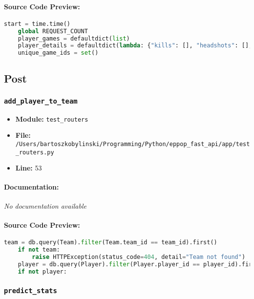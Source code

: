 \documentclass[11pt,a4paper]{article}
\begin{document}
\paragraph{Source Code Preview:}
\begin{lstlisting}[language=Python]
    start = time.time()
    global REQUEST_COUNT
    player_games = defaultdict(list)
    player_details = defaultdict(lambda: {"kills": [], "headshots": [], "rounds": []})
    unique_game_ids = set()
\end{lstlisting}

\vspace{1em}
\subsection{Post}

\subsubsection{\texttt{add\_player\_to\_team}}

\begin{itemize}
    \item \textbf{Module:} \texttt{test\_routers}
    \item \textbf{File:} \texttt{/Users/bartoszkobylinski/Programming/Python/eppop\_fast\_api/app/test\_routers.py}
    \item \textbf{Line:} 53
\end{itemize}

\paragraph{Documentation:} \textit{No documentation available}

\paragraph{Source Code Preview:}
\begin{lstlisting}[language=Python]
    team = db.query(Team).filter(Team.team_id == team_id).first()
    if not team:
        raise HTTPException(status_code=404, detail="Team not found")
    player = db.query(Player).filter(Player.player_id == player_id).first()
    if not player:
\end{lstlisting}

\vspace{1em}
\subsubsection{\texttt{predict\_stats}}
\end{document}
